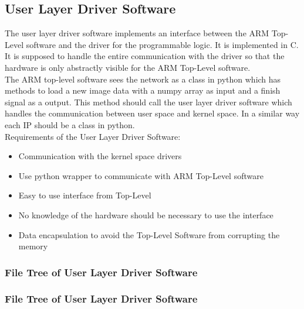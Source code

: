 \subsection{User Layer Driver Software}
The user layer driver software implements an interface between the ARM Top-Level software and the driver for the programmable logic. It is implemented in C. It is supposed to handle the entire communication with the driver so that the hardware is only abstractly visible for the ARM Top-Level software.\\
The ARM top-level software sees the network as a class in python which has methods to load a new image data with a numpy array as input and a finish signal as a output. This method should call the user layer driver software which handles the communication between user space and kernel space. In a similar way each IP should be a class in python. \\
Requirements of the User Layer Driver Software:
\begin{itemize} 
	\item Communication with the kernel space drivers 
	\item Use python wrapper to communicate with ARM Top-Level software
	\item Easy to use interface from Top-Level 
	\item No knowledge of the hardware should be necessary to use the interface
	\item Data encapsulation to avoid the Top-Level Software from corrupting the memory 
\end{itemize}

\subsubsection{File Tree of User Layer Driver Software} 
\subsubsection{File Tree of User Layer Driver Software} 
